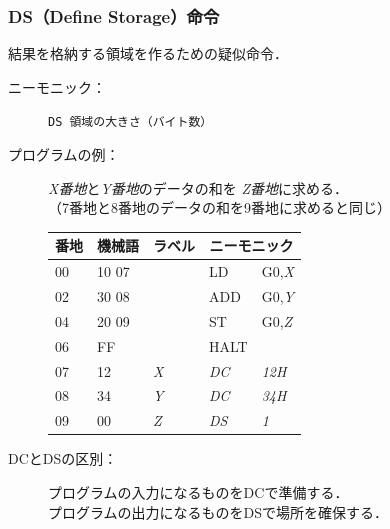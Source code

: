 \documentclass[handout]{beamer}        %
\begin{document}
\begin{frame}
  \frametitle{DS（Define Storage）命令}
  結果を格納する領域を作るための疑似命令．
  \begin{description}
  \item[ニーモニック：] \texttt{DS 領域の大きさ（バイト数）}
  \vfill

  \item[プログラムの例：]\emph{X番地}と\emph{Y番地}のデータの和を
    \emph{Z番地}に求める．\\
    （7番地と8番地のデータの和を9番地に求めると同じ）\\
    {\ttfamily\small\begin{center}
      \begin{tabular}{|l|l|l|l l|} \hline
        番地 & 機械語 & ラベル & \multicolumn{2}{|c|}{ニーモニック} \\
        \hline
        00 & 10 07 &          & LD        & G0,\emph{X}  \\
        02 & 30 08 &          & ADD       & G0,\emph{Y}  \\
        04 & 20 09 &          & ST        & G0,\emph{Z}  \\
        06 & FF    &          & HALT      &              \\
        07 & 12    & \emph{X} & \emph{DC} & \emph{12H}   \\
        08 & 34    & \emph{Y} & \emph{DC} & \emph{34H}   \\
        09 & 00    & \emph{Z} & \emph{DS} & \emph{1}     \\
        \hline
      \end{tabular}
    \end{center}}
    \vfill

    \item[DCとDSの区別：]プログラムの入力になるものをDCで準備する．\\
      プログラムの出力になるものをDSで場所を確保する．
  \end{description}
\end{frame}
\end{document}
